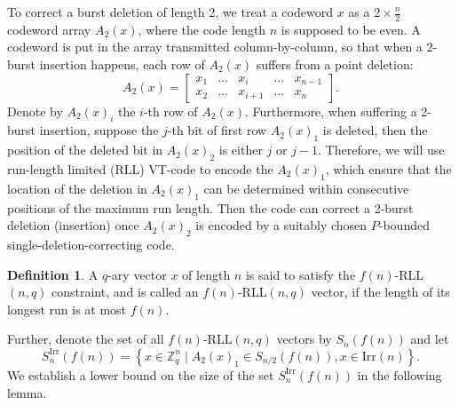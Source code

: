 \documentclass[pdflatex,sn-mathphys-num]{sn-jnl}
\theoremstyle{theorem}%
\theoremstyle{definition}
\newtheorem{definition}{Definition}
\theoremstyle{construction}
\newtheorem{open problem}{Open problem}
\begin{document}
To correct a burst deletion of length 2, we treat a codeword $x$ as a $2\times \frac{n}{2}$ codeword array $A_{2}(x)$, where the code length $n$ is supposed to be even. A codeword is put in the array transmitted column-by-column, so that when a 2-burst insertion happens, each row of $A_{2}(x)$ suffers from a point deletion:
$$A_{2}(x)=\begin{bmatrix}
	x_{1} &\ldots&x_{i}& \ldots &x_{n-1} \\
	x_{2}&\ldots&x_{i+1}&\ldots  &x_{n}
\end{bmatrix}.$$
Denote by $A_{2}(x)_{i}$ the $i$-th row of $A_{2}(x)$. Furthermore, when suffering a 2-burst insertion, suppose the $j$-th bit of first row $A_{2}(x)_{1}$ is deleted, then the position of the deleted bit in $A_{2}(x)_{2}$ is either $j$ or $j-1$. Therefore, we will use run-length limited (RLL) VT-code to encode the $A_{2}(x)_{1}$, which ensure that the location of the deletion in $A_{2}(x)_{1}$ can be determined within consecutive positions of the maximum run length. Then the code can correct a 2-burst deletion (insertion) once $A_{2}(x)_{2}$ is encoded by a suitably chosen $P$-bounded single-deletion-correcting code.
\begin{definition}
	A $q$-ary vector $x$ of length $n$ is said to satisfy the $f(n)$-RLL$(n,q)$ constraint, and is called an $f(n)$-RLL$(n,q)$ vector, if the length of its longest run is at most $f(n)$.
\end{definition}


Further, denote the set of all $f(n)$-RLL$(n, q)$ vectors by $S_{n}(f(n))$ and let 
$$S^{\mathrm{Irr}}_{n}(f(n)) = \left \{ x\in \mathbb{Z}_{q}^{n}\mid A_{2}(x)_{1}\in S_{n/2}(f(n)),x\in\text{Irr}(n)  \right \}.$$
We establish a lower bound on the size of the set $S^{\mathrm{Irr}}_{n}(f(n))$ in the following lemma.
\end{document}
